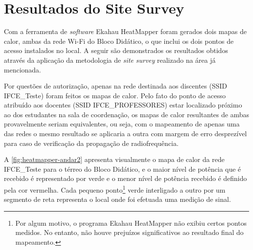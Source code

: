 \section{Resultados do Site Survey}
\label{sec:resultados-site-survey}

Com a ferramenta de \textit{software} Ekahau HeatMapper foram gerados dois mapas de calor, ambas da rede Wi-Fi do Bloco Didático, o que inclui os dois pontos de acesso instalados no local. A seguir são demonstrados os resultados obtidos através da aplicação da metodologia de \textit{site survey} realizado na área já mencionada.

Por questões de autorização, apenas na rede destinada aos discentes (SSID IFCE\_Teste) foram feitos os mapas de calor. Pelo fato do ponto de acesso atribuído aos docentes (SSID IFCE\_PROFESSORES) estar localizado próximo ao dos estudantes na sala de coordenação, os mapas de calor resultantes de ambas provavelmente seriam equivalentes, ou seja,  com o mapeamento de apenas uma das redes o mesmo resultado se aplicaria a outra com margem de erro desprezível para caso de verificação da propagação de radiofrequência.

A \autoref{fig:heatmapper-andar2} apresenta visualmente o mapa de calor da rede IFCE\_Teste para o térreo do Bloco Didático, e o maior nível de potência que é recebido é representado por verde e o menor nível de potência recebido é definido pela cor vermelha. Cada pequeno ponto\footnote[6]{Por algum motivo, o programa Ekahau HeatMapper não exibiu certos pontos medidos. No entanto, não houve prejuízos significativos ao resultado final do mapeamento.} verde interligado a outro por um segmento de reta representa o local onde foi efetuada uma medição de sinal.
\newpage
\begin{figure}[H]
	\centering
\end{figure}

